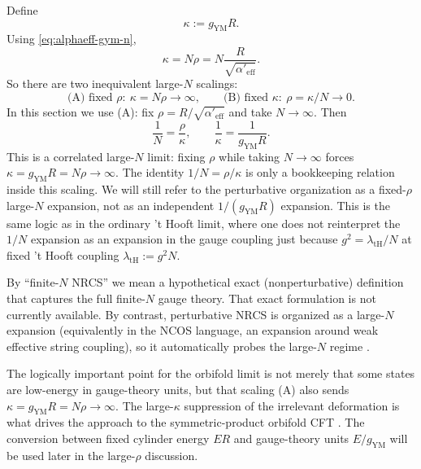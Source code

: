 \documentclass[11pt]{article}
\newcommand{\Aeff}{\alpha'_{\mathrm{eff}}}
\begin{document}
Define
\begin{equation}\label{eq:kappa-def}
\kappa:=g_{\mathrm{YM}}R.
\end{equation}
Using \eqref{eq:alphaeff-gym-n},
\begin{equation}\label{eq:kappa-rho}
\kappa=N\rho=N\frac{R}{\sqrt{\Aeff}}.
\end{equation}
So there are two inequivalent large-$N$ scalings:
\begin{equation}\label{eq:largeN-two-scalings}
\text{(A) fixed }\rho:\ \kappa=N\rho\to\infty,
\qquad
\text{(B) fixed }\kappa:\ \rho=\kappa/N\to 0.
\end{equation}
In this section we use (A): fix $\rho=R/\sqrt{\Aeff}$ and take $N\to\infty$.
Then
\begin{equation}\label{eq:oneoverN-oneoverkappa}
\frac{1}{N}=\frac{\rho}{\kappa},
\qquad
\frac{1}{\kappa}=\frac{1}{g_{\mathrm{YM}}R}.
\end{equation}
This is a correlated large-$N$ limit: fixing $\rho$ while taking $N\to\infty$
forces $\kappa=g_{\mathrm{YM}}R=N\rho\to\infty$. The identity
$1/N=\rho/\kappa$ is only a bookkeeping relation inside this scaling. We will
still refer to the perturbative organization as a fixed-$\rho$ large-$N$
expansion, not as an independent $1/(g_{\mathrm{YM}}R)$ expansion. This is the
same logic as in the ordinary 't Hooft limit, where one does not reinterpret
the $1/N$ expansion as an expansion in the gauge coupling just because
$g^2=\lambda_{\mathrm{tH}}/N$ at fixed 't Hooft coupling
$\lambda_{\mathrm{tH}}:=g^2N$.

By ``finite-$N$ NRCS'' we mean a hypothetical exact (nonperturbative) definition that captures the full finite-$N$ gauge theory. That exact formulation is not currently available. By contrast, perturbative NRCS is organized as a large-$N$ expansion (equivalently in the NCOS language, an expansion around weak effective string coupling), so it automatically probes the large-$N$ regime \cite{gomis2000nonrelativisticclosedstringtheory,klebanov200011dimensionalncosun}.

The logically important point for the orbifold limit is not merely that some
states are low-energy in gauge-theory units, but that scaling (A) also sends
$\kappa=g_{\mathrm{YM}}R=N\rho\to\infty$. The large-$\kappa$ suppression of the
irrelevant deformation is what drives the approach to the symmetric-product
orbifold CFT \cite{dijkgraaf1997matrixstring}. The conversion between fixed
cylinder energy $ER$ and gauge-theory units $E/g_{\mathrm{YM}}$ will be used
later in the large-$\rho$ discussion.
\end{document}

